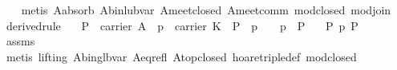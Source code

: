\documentclass{llncs}
\begin{document}
\begin{isabellebody}
\ \ \isamarkupfalse%
\ {}metis\ A{}absorb{}\ A{}bin{}lub{}var\ A{}meet{}closed\ A{}meet{}comm\ mod{}closed\ mod{}join{}{}%
\endisatagproof
{\isafoldproof}%
%
\isadelimproof
\isanewline
%
\endisadelimproof
\isanewline
{}\isamarkupfalse%
\ derived{}rule{}{}\isanewline
\ \ \ {}P\ {}\ carrier\ A{}\ \ {}p\ {}\ carrier\ K{}\ \ {}P\ {}\ p\ {}\ {}{}\ {}\ p{}\ {}\ P{}\isanewline
\ \ \ {}{}P{}\ p\ {}P{}{}\isanewline
%
\isadelimproof
\ \ %
\endisadelimproof
%
\isatagproof
{}\isamarkupfalse%
\ assms\isanewline
\ \ \isamarkupfalse%
\ {}metis\ {}lifting{}\ A{}bin{}glb{}var\ A{}eq{}refl\ A{}top{}closed\ hoare{}triple{}def\ mod{}closed{}%
\endisatagproof

\end{isabellebody}
\end{document}
